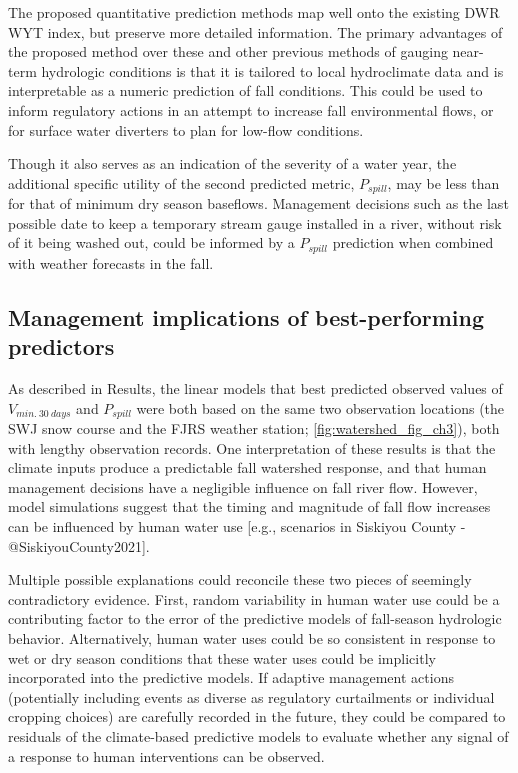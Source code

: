 \documentclass[
]{article}
\begin{document}
The proposed quantitative prediction methods map well onto the existing
DWR WYT index, but preserve more detailed information. The primary
advantages of the proposed method over these and other previous methods
of gauging near-term hydrologic conditions is that it is tailored to
local hydroclimate data and is interpretable as a numeric prediction of
fall conditions. This could be used to inform regulatory actions in an
attempt to increase fall environmental flows, or for surface water
diverters to plan for low-flow conditions.

Though it also serves as an indication of the severity of a water year,
the additional specific utility of the second predicted metric,
\(P_{spill}\), may be less than for that of minimum dry season
baseflows. Management decisions such as the last possible date to keep a
temporary stream gauge installed in a river, without risk of it being
washed out, could be informed by a \(P_{spill}\) prediction when
combined with weather forecasts in the fall.

\hypertarget{management-implications-of-best-performing-predictors}{%
\subsection{Management implications of best-performing
predictors}\label{management-implications-of-best-performing-predictors}}

As described in Results, the linear models that best predicted observed
values of \(V_{min.~30~days}\) and \(P_{spill}\) were both based on the
same two observation locations (the SWJ snow course and the FJRS weather
station; \autoref{fig:watershed_fig_ch3}), both with lengthy observation
records. One interpretation of these results is that the climate inputs
produce a predictable fall watershed response, and that human management
decisions have a negligible influence on fall river flow. However, model
simulations suggest that the timing and magnitude of fall flow increases
can be influenced by human water use {[}e.g., scenarios in Siskiyou
County -@SiskiyouCounty2021{]}.

Multiple possible explanations could reconcile these two pieces of
seemingly contradictory evidence. First, random variability in human
water use could be a contributing factor to the error of the predictive
models of fall-season hydrologic behavior. Alternatively, human water
uses could be so consistent in response to wet or dry season conditions
that these water uses could be implicitly incorporated into the
predictive models. If adaptive management actions (potentially including
events as diverse as regulatory curtailments or individual cropping
choices) are carefully recorded in the future, they could be compared to
residuals of the climate-based predictive models to evaluate whether any
signal of a response to human interventions can be observed.
\end{document}
